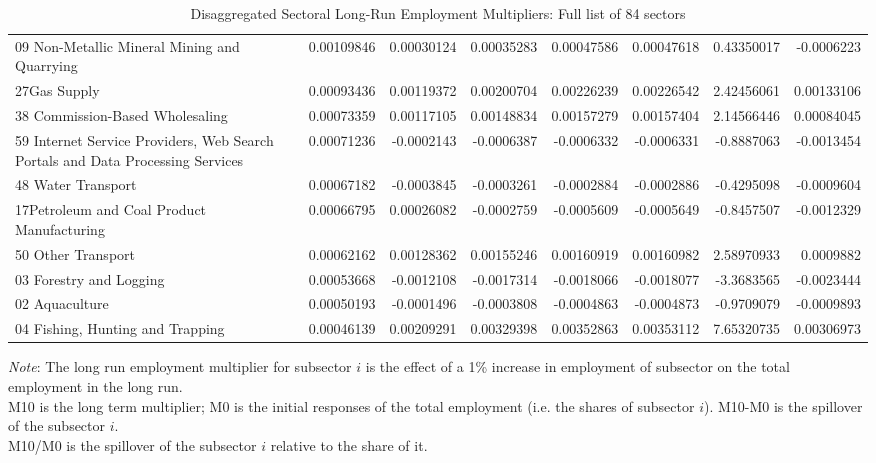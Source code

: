 \documentclass{monashthesis}
\begin{document}
\begin{table}[ht]
{\begin{tabular}{|l|r|rrrr|rr|}
    09 Non-Metallic Mineral Mining and Quarrying & 0.00109846 & 0.00030124 & 0.00035283 & 0.00047586 & 0.00047618 & 0.43350017 & -0.0006223 \\
    27Gas Supply & 0.00093436 & 0.00119372 & 0.00200704 & 0.00226239 & 0.00226542 & 2.42456061 & 0.00133106 \\
    38 Commission-Based Wholesaling & 0.00073359 & 0.00117105 & 0.00148834 & 0.00157279 & 0.00157404 & 2.14566446 & 0.00084045 \\
    59 Internet Service Providers, Web Search Portals and Data Processing Services & 0.00071236 & -0.0002143 & -0.0006387 & -0.0006332 & -0.0006331 & -0.8887063 & -0.0013454 \\
    48 Water Transport & 0.00067182 & -0.0003845 & -0.0003261 & -0.0002884 & -0.0002886 & -0.4295098 & -0.0009604 \\
    17Petroleum and Coal Product Manufacturing & 0.00066795 & 0.00026082 & -0.0002759 & -0.0005609 & -0.0005649 & -0.8457507 & -0.0012329 \\
    50 Other Transport & 0.00062162 & 0.00128362 & 0.00155246 & 0.00160919 & 0.00160982 & 2.58970933 & 0.0009882 \\
    03 Forestry and Logging & 0.00053668 & -0.0012108 & -0.0017314 & -0.0018066 & -0.0018077 & -3.3683565 & -0.0023444 \\
    02 Aquaculture & 0.00050193 & -0.0001496 & -0.0003808 & -0.0004863 & -0.0004873 & -0.9709079 & -0.0009893 \\
    04 Fishing, Hunting and Trapping & 0.00046139 & 0.00209291 & 0.00329398 & 0.00352863 & 0.00353112 & 7.65320735 & 0.00306973 \\
    \hline\hline 
    \end{tabular}} 
    \begin{tablenotes} 
      \footnotesize
      \item \emph{Note}: The long run employment multiplier for subsector $i$ is the effect of a 1\% increase in employment of subsector on the total employment in the long run. \\
      M10 is the long term multiplier; M0 is the initial responses of the total employment (i.e. the shares of subsector $i$). 
      M10-M0 is the spillover of the subsector $i$. \\
      M10/M0 is the spillover of the subsector $i$ relative to the share of it.
\end{tablenotes}
\caption{Disaggregated Sectoral Long-Run Employment Multipliers: Full list of 84 sectors}
  \label{dis:emp}
\end{table}

\printbibliography[heading=bibintoc]
\end{document}
